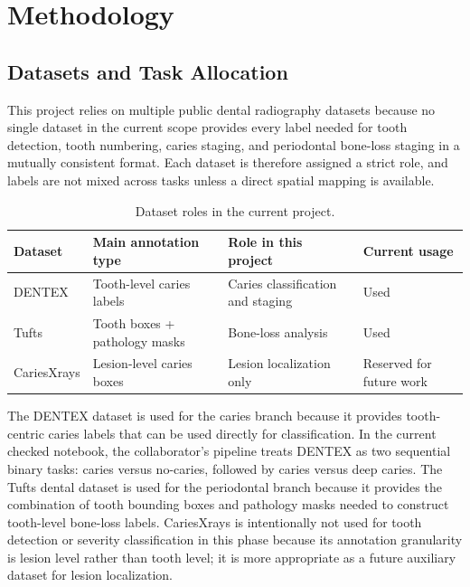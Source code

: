 
\chapter{Methodology}
\label{ch:methodology}

\section{Datasets and Task Allocation}
\label{sec:method-dataset}

This project relies on multiple public dental radiography datasets because no
single dataset in the current scope provides every label needed for tooth
detection, tooth numbering, caries staging, and periodontal bone-loss staging
in a mutually consistent format. Each dataset is therefore assigned a strict
role, and labels are not mixed across tasks unless a direct spatial mapping is
available.

\begin{table}[htbp]
  \centering
  \caption{Dataset roles in the current project.}
  \label{tab:dataset-role-summary}
  \begin{tabular}{@{}llll@{}}
    \toprule
    Dataset & Main annotation type & Role in this project & Current usage \\
    \midrule
    DENTEX & Tooth-level caries labels & Caries classification and staging & Used \\
    Tufts & Tooth boxes + pathology masks & Bone-loss analysis & Used \\
    CariesXrays & Lesion-level caries boxes & Lesion localization only & Reserved for future work \\
    \bottomrule
  \end{tabular}
\end{table}

The DENTEX dataset is used for the caries branch because it provides
tooth-centric caries labels that can be used directly for classification. In
the current checked notebook, the collaborator's pipeline treats DENTEX as two
sequential binary tasks: caries versus no-caries, followed by caries versus
deep caries. The Tufts dental dataset is used for the periodontal branch
because it provides the combination of tooth bounding boxes and pathology masks
needed to construct tooth-level bone-loss labels. CariesXrays is intentionally
not used for tooth detection or severity classification in this phase because
its annotation granularity is lesion level rather than tooth level; it is more
appropriate as a future auxiliary dataset for lesion localization.

